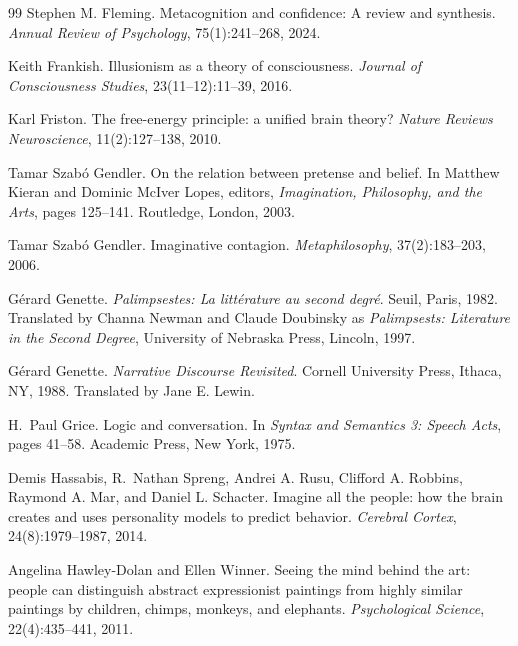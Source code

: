 \documentclass[11pt,a4paper]{article}
\theoremstyle{remark}\newtheorem{remark}[definition]{Remark}
\begin{document}
\begin{thebibliography}{99}
Stephen M. Fleming.
\newblock Metacognition and confidence: A review and synthesis.
\newblock \emph{Annual Review of Psychology}, 75(1):241--268, 2024.

Keith Frankish.
\newblock Illusionism as a theory of consciousness.
\newblock \emph{Journal of Consciousness Studies}, 23(11--12):11--39, 2016.

Karl Friston.
\newblock The free-energy principle: a unified brain theory?
\newblock \emph{Nature Reviews Neuroscience}, 11(2):127--138, 2010.

Tamar Szab\'o Gendler.
\newblock On the relation between pretense and belief.
\newblock In Matthew Kieran and Dominic McIver Lopes, editors, \emph{Imagination, Philosophy, and the Arts}, pages 125--141. Routledge, London, 2003.

Tamar Szab\'o Gendler.
\newblock Imaginative contagion.
\newblock \emph{Metaphilosophy}, 37(2):183--203, 2006.

G\'erard Genette.
\newblock \emph{Palimpsestes: La litt\'erature au second degr\'e}.
\newblock Seuil, Paris, 1982. Translated by Channa Newman and Claude Doubinsky as \emph{Palimpsests: Literature in the Second Degree}, University of Nebraska Press, Lincoln, 1997.

G\'erard Genette.
\newblock \emph{Narrative Discourse Revisited}.
\newblock Cornell University Press, Ithaca, NY, 1988. Translated by Jane E. Lewin.

H.~Paul Grice.
\newblock Logic and conversation.
\newblock In \emph{Syntax and Semantics 3: Speech Acts}, pages 41--58. Academic Press, New York, 1975.

Demis Hassabis, R.~Nathan Spreng, Andrei A. Rusu, Clifford A. Robbins, Raymond A. Mar, and Daniel L. Schacter.
\newblock Imagine all the people: how the brain creates and uses personality models to predict behavior.
\newblock \emph{Cerebral Cortex}, 24(8):1979--1987, 2014.

Angelina Hawley-Dolan and Ellen Winner.
\newblock Seeing the mind behind the art: people can distinguish abstract expressionist paintings from highly similar paintings by children, chimps, monkeys, and elephants.
\newblock \emph{Psychological Science}, 22(4):435--441, 2011.


\end{thebibliography}
\end{document}
